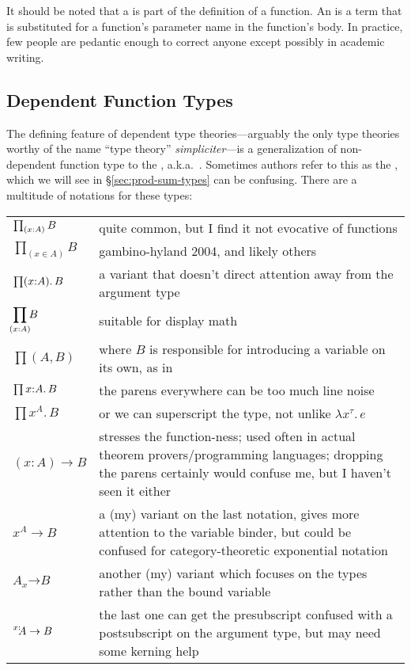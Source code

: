 \documentclass[11pt]{article} %
\theoremstyle{definition}
\theoremstyle{remark}
\begin{document}
It should be noted that a  is part of the definition of a function.
An  is a term that is substituted for a function's parameter name in the function's body.
In practice, few people are pedantic enough to correct anyone except possibly in academic writing.


\subsection{Dependent Function Types}

The defining feature of dependent type theories---arguably the only type theories worthy of the name ``type theory'' \textit{simpliciter}---is a generalization of non-dependent function type to the , a.k.a.\ .
Sometimes authors refer to this as the \cite{barendregt_1991,martin-lof_1984}, which we will see in \S\ref{sec:prod-sum-types} can be confusing.
There are a multitude of notations for these types:

\begin{center}
\renewcommand{\arraystretch}{1.2}
\begin{tabular}{lp{10cm}}
$\prod_{(x \mathord: A)}B$ & quite common, but I find it not evocative of functions \\
$\prod_{(x \in A)}B$ & gambino-hyland 2004, and likely others \\
$\prod(x \mathord: A).\,B$ & a variant that doesn't direct attention away from the argument type \\
$\displaystyle\prod_{\mathclap{(x : A)}}B$ & suitable for display math \\
$\prod(A, B)$ & where $B$ is responsible for introducing a variable on its own, as in \cite{martin-lof_1984} \\
$\prod x \mathord: A.\,B$ & the parens everywhere can be too much line noise \\
$\prod x^A.\,B$ & or we can superscript the type, not unlike $\lambda x^\tau.\,e$ \\
$(x : A) \to B$ & stresses the function-ness; used often in actual theorem provers/programming languages; dropping the parens certainly would confuse me, but I haven't seen it either \\
$x^A \to B$ & a (my) variant on the last notation, gives more attention to the variable binder, but could be confused for category-theoretic exponential notation \\
$A \mathbin{_{x}\mathord\to} B$ & another (my) variant which focuses on the types rather than the bound variable \\
$\prescript{x:\!\!}{}A \to B$ & the last one can get the presubscript confused with a postsubscript on the argument type, but may need some kerning help \\
\end{tabular}
\end{center}
\end{document}
